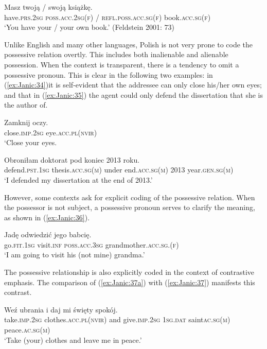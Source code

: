 \documentclass[output=paper]{langscibook}
\begin{document}
\ea \label{ex:Janic:33}
\gll Masz		 twoją 	 / 	 swoją	 książkę.\\
	 have.\textsc{prs.2sg}	\textsc{poss.acc.2sg(f)}	/ 	 \textsc{refl.poss.acc.sg(f)}	book.\textsc{acc.sg(f)} \\
\glt ‘You have your / your own book.’					 (Feldstein 2001: 73)
\z 
 	
Unlike English and many other languages, Polish is not very prone to code the possessive relation overtly. This includes both inalienable and alienable possession. When the context is transparent, there is a tendency to omit a possessive pronoun. This is clear in the following two examples: in (\ref{ex:Janic:34})it is self-evident that the addressee can only close his/her own eyes; and that in (\ref{ex:Janic:35}) the agent could only defend the dissertation that she is the author of. 

\ea \label{ex:Janic:34}
\gll Zamknij	oczy.\\
	 close.\textsc{imp.2sg}	eye.\textsc{acc.pl(nvir)}\\
\glt ‘Close your eyes.
\z

\ea \label{ex:Janic:35}	
\gll Obroniłam	 doktorat		 pod	 koniec		 2013	roku.\\
	 defend.\textsc{pst.1sg}	thesis.\textsc{acc.sg(m)}	under	end.\textsc{acc.sg(m)}	2013	year.\textsc{gen.sg(m)}\\
\glt ‘I defended my dissertation at the end of 2013.’
\z
	
However, some contexts ask for explicit coding of the possessive relation. When the possessor is not subject, a possessive pronoun serves to clarify the meaning, as shown in (\ref{ex:Janic:36}). 

\ea \label{ex:Janic:36}
\gll Jadę odwiedzić jego babcię.\\
	 go.\textsc{fit.1sg}		visit.\textsc{inf}		\textsc{poss.acc.3sg}	grandmother.\textsc{acc.sg.(f)}\\
\glt ‘I am going to visit his (not mine) grandma.’
\z 	
	
The possessive relationship is also explicitly coded in the context of contrastive emphasis. The comparison of (\ref{ex:Janic:37a}) with (\ref{ex:Janic:37}) manifests this contrast.

\ea \label{ex:Janic:37}
\ea \label{ex:Janic:37a}
\gll Weź			 ubrania	 i	 daj	 mi	 święty	spokój.\\
		take.\textsc{imp.2sg}	clothes.\textsc{acc.pl(nvir)}	and	 give.\textsc{imp.2sg}	\textsc{1sg.dat}	saint\textsc{ac.sg(m)} 	peace.\textsc{ac.sg(m)}\\
\glt ‘Take (your) clothes and leave me in peace.’
	
\end{document}

